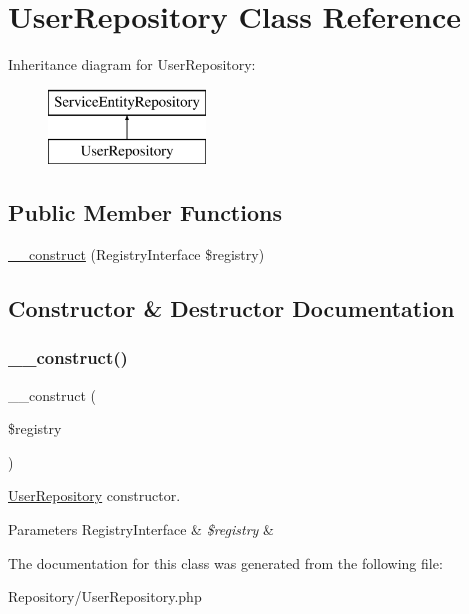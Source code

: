 \hypertarget{class_app_1_1_repository_1_1_user_repository}{}\section{User\+Repository Class Reference}
\label{class_app_1_1_repository_1_1_user_repository}
Inheritance diagram for User\+Repository\+:\begin{figure}[H]
\begin{center}
\leavevmode
\includegraphics[height=2.000000cm]{class_app_1_1_repository_1_1_user_repository}
\end{center}
\end{figure}
\subsection*{Public Member Functions}
\begin{DoxyCompactItemize}
\item 
\mbox{\hyperlink{class_app_1_1_repository_1_1_user_repository_aadca7edd263e228921a1860bb6b9c252}{\+\_\+\+\_\+construct}} (Registry\+Interface \$registry)
\end{DoxyCompactItemize}


\subsection{Constructor \& Destructor Documentation}
\mbox{\label{class_app_1_1_repository_1_1_user_repository_aadca7edd263e228921a1860bb6b9c252}} 
\subsubsection{\texorpdfstring{\_\_construct()}{\_\_construct()}}
{\footnotesize\ttfamily \+\_\+\+\_\+construct (\begin{DoxyParamCaption}\item[{Registry\+Interface}]{\$registry }\end{DoxyParamCaption})}

\mbox{\hyperlink{class_app_1_1_repository_1_1_user_repository}{User\+Repository}} constructor. 
\begin{DoxyParams}[1]{Parameters}
Registry\+Interface & {\em \$registry} & \\
\hline
\end{DoxyParams}


The documentation for this class was generated from the following file\+:\begin{DoxyCompactItemize}
\item 
Repository/User\+Repository.\+php\end{DoxyCompactItemize}
